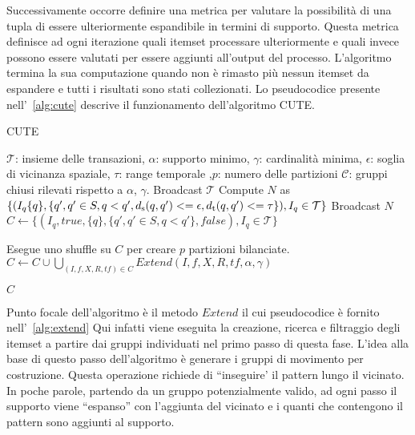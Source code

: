 Successivamente occorre definire una metrica per valutare la possibilità di una tupla di essere ulteriormente espandibile in termini di 
supporto. 
Questa metrica definisce ad ogni iterazione quali itemset processare ulteriormente e quali invece possono essere valutati per essere aggiunti 
all'output del processo.
L'algoritmo termina la sua computazione quando non è rimasto più nessun itemset da espandere e tutti i risultati sono stati collezionati.
Lo pseudocodice presente nell'~\cref{alg:cute} descrive il funzionamento dell'algoritmo CUTE.
\begin{algorithm}[H]
\caption{CUTE}\label{alg:cute}
\begin{algorithmic}[1]
\Require $\mathcal{T}$: insieme delle transazioni, $\alpha$: supporto minimo, $\gamma$: cardinalità minima, $\epsilon$: soglia di vicinanza spaziale, $\tau$: range temporale ,$p$: numero delle partizioni
\Ensure $\mathcal{C}$: gruppi chiusi rilevati rispetto a $\alpha$, $\gamma$.
\State Broadcast $\mathcal{T}$ 
\State Compute $N$ as $\{ (I_{q} \{ q \}, \{q', q' \in S, q < q', d\textsubscript{s}(q, q') <= \epsilon,  d\textsubscript{t}(q, q') <= \tau \}), I_{q} \in \mathcal{T}\}$
\State Broadcast $N$ 
\State $C \gets \{ (I_{q}, true, \{ q \}, \{q', q' \in S, q < q'\}, false), I_{q} \in \mathcal{T}\}$
\item[] 
\item[] 

    \State Esegue uno shuffle su $C$ per creare $p$ partizioni bilanciate.
    \State $C \gets C \cup \bigcup_{(I, f, X, R, tf) \in C} Extend(I, f, X, R, tf, \alpha, \gamma)$
    \item[] 
\EndWhile
\State \Return $C$
\end{algorithmic}
\end{algorithm}

Punto focale dell'algoritmo è il metodo \(Extend\) il cui pseudocodice è fornito nell'~\cref{alg:extend}
Qui infatti viene eseguita la creazione, ricerca e filtraggio degli itemset a partire dai gruppi individuati nel primo passo di questa fase.
L'idea alla base di questo passo dell'algoritmo è generare i gruppi di movimento per costruzione.
Questa operazione richiede di ``inseguire' il pattern lungo il vicinato.
In poche parole, partendo da un gruppo potenzialmente valido, ad ogni passo il supporto viene ``espanso'' con l'aggiunta del vicinato e i quanti che contengono il pattern sono aggiunti al supporto.

